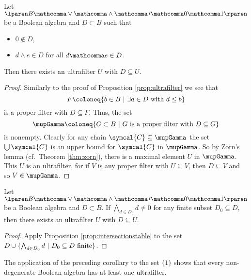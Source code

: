 \begin{proposition}
\label{prop:intersectionstable}
  Let
  $\lparen B \mathcomma \vee \mathcomma \wedge \mathcomma \, \prime
  \mathcomma 0 \mathcomma 1 \rparen$
  be a Boolean algebra and $D \subset B$ such that
  \begin{itemize}
    \item $0 \notin D$,
    \item $d \wedge e \in D$ for all $d \mathcomma e \in D$.
  \end{itemize}
  Then there exists an ultrafilter $U$ with $D \subseteq U$.
\end{proposition}

\begin{proof}
  Similarly to the proof of Proposition \ref{prop:ultrafilter} we see that
  \[
    F \coloneq
    \lbrace
    b \in B
    \pipe
    \exists d \in D \text{ with } d \leq b
    \rbrace
  \]
  is a proper filter with $D \subseteq F$.
  Thus, the set
  \[
    \mupGamma
    \coloneq
    \lbrace G \subset B
    \pipe
    G \text{ is a proper filter with } D \subseteq G
    \rbrace
  \]
  is nonempty.
  Clearly for any chain $\symcal{C} \subseteq \mupGamma$
  the set $\bigcup \symcal{C}$
  is an upper bound for $\symcal{C}$ in $\mupGamma$.
  So by Zorn's lemma (cf.\ Theorem \ref{thm:zorn}),
  there is a maximal element $U$ in $\mupGamma$.
  This $U$ is an ultrafilter,
  for if $V$ is any proper filter with $U \subseteq V$,
  then $D \subseteq V$ and so $V \in \mupGamma$.
\end{proof}

\begin{corollary}
  Let
  $\lparen B \mathcomma \vee \mathcomma \wedge \mathcomma \, \prime
  \mathcomma 0 \mathcomma 1 \rparen$
  be a Boolean algebra and $D \subset B$.
  If
  $
    \bigwedge_{ d \in D_0 } d \ne 0
  $
  for any finite subset $D_0 \subseteq D$,
  then there exists an ultrafilter $U$ with $D \subseteq U$.
\end{corollary}

\begin{proof}
  Apply Proposition \ref{prop:intersectionstable} to the set
  $
    D \cup
    \lbrace
    \bigwedge_{ d \in D_0 } d
    \ \vert\ 
    D_0 \subseteq D \text{ finite}
    \rbrace
  $.
\end{proof}

\begin{remark}
  The application of the preceding corollary
  to the set $\lbrace 1 \rbrace$ shows
  that every non-degenerate Boolean algebra has at least one ultrafilter.
\end{remark}

